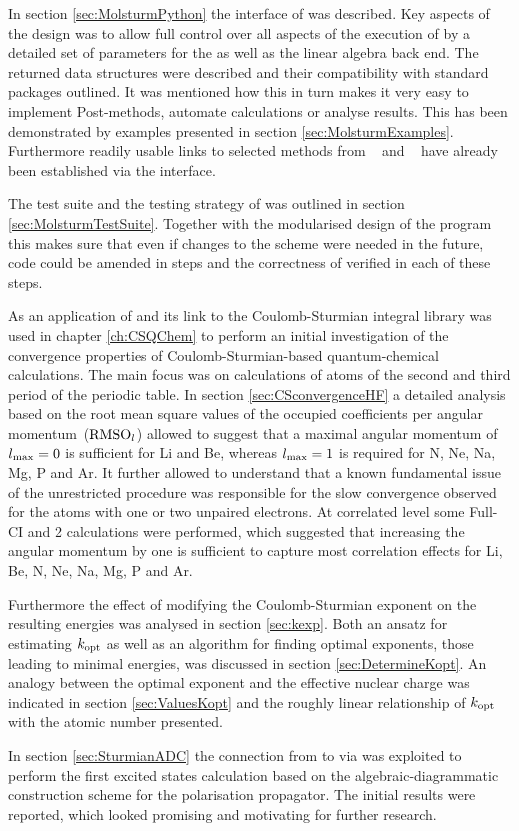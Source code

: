 In section \ref{sec:MolsturmPython}
the \python interface of \molsturm was described.
Key aspects of the design
was to allow full control over all aspects
of the execution of \molsturm by a detailed set of parameters
for the \SCF as well as the linear algebra back end.
The returned data structures were described
and their compatibility with standard \python packages outlined.
It was mentioned how this in turn
makes it very easy to implement Post-\HF methods,
automate calculations or analyse results.
This has been demonstrated by examples
presented in section \ref{sec:MolsturmExamples}.
Furthermore
readily usable links to selected methods
from \pyscf~\cite{Sun2017} and \adcman~\cite{Wormit2014}
have already been established via the
\python interface.

The test suite and the testing strategy
of \molsturm was outlined in section \ref{sec:MolsturmTestSuite}.
Together with the modularised design of the program
this makes sure that even if changes to the \SCF scheme
were needed in the future,
code could be amended in steps
and the correctness of \molsturm verified in each of these steps.


As an application of \molsturm and its link to the
Coulomb-Sturmian integral library \sturmint was used
in chapter \ref{ch:CSQChem} to perform an initial investigation
of the convergence properties of Coulomb-Sturmian-based
quantum-chemical calculations.
The main focus was on \HF calculations of atoms
of the second and third period of the periodic table.
In section \ref{sec:CSconvergenceHF}
a detailed analysis based on the root mean square values
of the occupied coefficients per angular momentum~($\text{RMSO}_l$)
allowed to suggest that
a maximal angular momentum of $l_\text{max} = 0$
is sufficient for Li and Be,
whereas $l_\text{max} = 1$ is required for N, Ne, Na, Mg, P and Ar.
It further allowed to understand that a known fundamental issue of
the unrestricted \HF procedure
was responsible for the slow convergence observed for the
atoms with one or two unpaired electrons.
At correlated level some Full-CI and {\MP}2 calculations
were performed,
which suggested that increasing the angular momentum
by one is sufficient to capture
most correlation effects for Li, Be, N, Ne, Na, Mg, P and Ar.

Furthermore the effect of modifying the Coulomb-Sturmian
exponent on the resulting \HF energies was analysed in section \ref{sec:kexp}.
Both an ansatz for estimating $k_\text{opt}$ as well as
an algorithm for finding optimal exponents,
\ie those leading to minimal energies,
was discussed in section \ref{sec:DetermineKopt}.
An analogy between the optimal exponent and
the effective nuclear charge was indicated in section \ref{sec:ValuesKopt}
and the roughly
linear relationship of $k_\text{opt}$ with the atomic number presented.

In section \ref{sec:SturmianADC} the connection from
\molsturm to \adcman via \python
was exploited to perform the first
excited states calculation based on the algebraic-diagrammatic construction
scheme for the polarisation propagator.
The initial results were reported,
which looked promising and motivating for further research.
